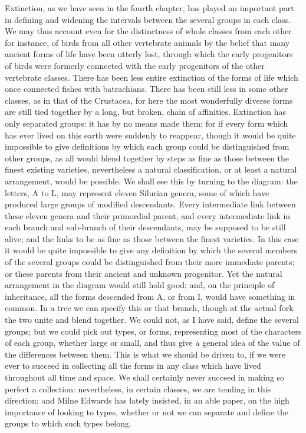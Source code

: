 \indent Extinction, as we have seen in the fourth chapter, has played an important part in defining and widening the intervals between the several groups in each class. We may thus account even for the distinctness of whole classes from each other for instance, of birds from all other vertebrate animals by the belief that many ancient forms of life have been utterly lost, through which the early progenitors of birds were formerly connected with the early progenitors of the other vertebrate classes. There has been less entire extinction of the forms of life which once connected fishes with batrachians. There has been still less in some other classes, as in that of the Crustacea, for here the most wonderfully diverse forms are still tied together by a long, but broken, chain of affinities. Extinction has only separated groups: it has by no means made them; for if every form which has ever lived on this earth were suddenly to reappear, though it would be quite impossible to give definitions by which each group could be distinguished from other groups, as all would blend together by steps as fine as those between the finest existing varieties, nevertheless a natural classification, or at least a natural arrangement, would be possible. We shall see this by turning to the diagram: the letters, A to L, may represent eleven Silurian genera, some of which have produced large groups of modified descendants. Every intermediate link between these eleven genera and their primordial parent, and every intermediate link in each branch and sub-branch of their descendants, may be supposed to be still alive; and the links to be as fine as those between the finest varieties. In this case it would be quite impossible to give any definition by which the several members of the several groups could be distinguished from their more immediate parents; or these parents from their ancient and unknown progenitor. Yet the natural arrangement in the diagram would still hold good; and, on the principle of inheritance, all the forms descended from A, or from I, would have something in common. In a tree we can specify this or that branch, though at the actual fork the two unite and blend together. We could not, as I have said, define the several groups; but we could pick out types, or forms, representing most of the characters of each group, whether large or small, and thus give a general idea of the value of the differences between them. This is what we should be driven to, if we were ever to succeed in collecting all the forms in any class which have lived throughout all time and space. We shall certainly never succeed in making so perfect a collection: nevertheless, in certain classes, we are tending in this direction; and Milne Edwards has lately insisted, in an able paper, on the high importance of looking to types, whether or not we can separate and define the groups to which such types belong.~\\
